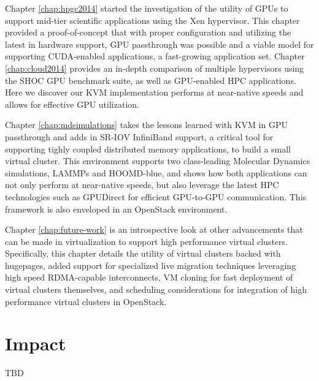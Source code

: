 Chapter \ref{chap:hpgc2014} started the investigation of the utility of GPUs to support mid-tier scientific applications using the Xen hypervisor. This chapter provided a proof-of-concept that with proper configuration and utilizing the latest in hardware support, GPU passthrough was possible and a viable model for supporting CUDA-enabled applications, a fast-growing application set. Chapter \ref{chap:cloud2014} provides an in-depth comparison of multiple hypervisors using the SHOC GPU benchmark suite, as well as GPU-enabled HPC applications. Here we discover our KVM implementation performs at near-native speeds and allows for effective GPU utilization. 

Chapter \ref{chap:mdsimulations} takes the lessons learned with KVM in GPU passthrough and adds in SR-IOV InfiniBand support, a critical tool for supporting tighly coupled distributed memory applications, to build a small virtual cluster. This environment supports two class-leading Molecular Dynamics simulations, LAMMPs and HOOMD-blue, and shows how both applications can not only perform at near-native speeds, but also leverage the latest HPC technologies such as GPUDirect for efficient GPU-to-GPU communication. This framework is also enveloped in an OpenStack environment.     

Chapter \ref{chap:future-work} is an introspective look at other advancements that can be made in virtualization to support high performance virtual clusters. Specifically, this chapter details the utility of virtual clusters backed with hugepages, added support for specialized live migration techniques leveraging high speed RDMA-capable interconnects, VM cloning for fast deployment of virtual clusters themselves, and scheduling considerations for integration of high performance virtual clusters in OpenStack.  




\section{Impact}
\label{sec:impact}

TBD


